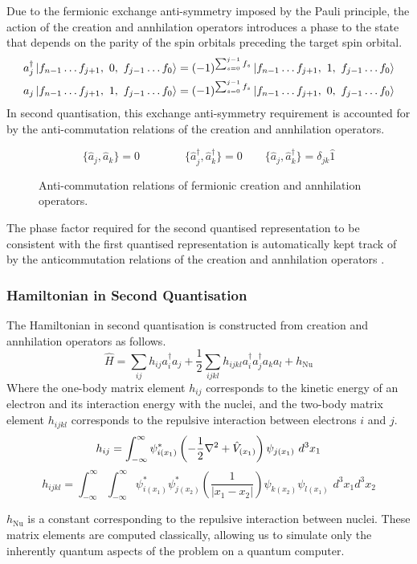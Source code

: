 Due to the fermionic exchange anti-symmetry imposed by the Pauli principle, the action of the creation and annhilation operators introduces a phase to the state that depends on the parity of the spin orbitals preceding the target spin orbital.
\begin{align*}
    a_j^\dagger \ket{f_{n-1} \dots
    f_{j+1},\,\, 0,\,\, f_{j-1} \dots f_0} &=
    (-1)^{\sum_{s=0}^{j-1} f_s}
    \ket{f_{n-1} \dots f_{j+1},\,\, 1,\,\, f_{j-1} \dots f_0} \\
    a_j \ket{f_{n-1} \dots f_{j+1},\,\, 1,\,\, f_{j-1} \dots f_0} &=
    (-1)^{\sum_{s=0}^{j-1} f_s}
    \ket{f_{n-1} \dots f_{j+1},\,\, 0,\,\, f_{j-1} \dots f_0}
\end{align*}
In second quantisation, this exchange anti-symmetry requirement is accounted for by the anti-commutation relations of the creation and annhilation operators.
\begin{figure}[H]
\begin{equation*}
    \{ \hat a_{j}, \hat a_{k} \} = 0 \qquad \qquad
    \{ \hat a_{j}^{\dagger}, \hat a_{k}^{\dagger} \} = 0 \qquad
    \{ \hat a_{j}, \hat a_{k}^{\dagger} \} = \delta_{jk} \hat{1}
\end{equation*}
\caption{Anti-commutation relations of fermionic creation and annhilation operators.}
\end{figure}
The phase factor required for the second quantised representation to be consistent with the first quantised representation is automatically kept track of by the anticommutation relations of the creation and annhilation operators \cite{Helgaker2000}.

\subsubsection{Hamiltonian in Second Quantisation}
The Hamiltonian in second quantisation is constructed from creation and annhilation operators as follows.
\begin{equation*}
    \hat H =
    \sum_{ij} h_{ij} a^\dagger_i a_j +
    \frac{1}{2} \sum_{ijkl} h_{ijkl} a^\dagger_i a^\dagger_j a_k a_l +
    h_\text{Nu}
\end{equation*}
Where the one-body matrix element $h_{ij}$ corresponds to the kinetic energy of an electron and its interaction energy with the nuclei, and the two-body matrix element $h_{ijkl}$ corresponds to the repulsive interaction between electrons $i$ and $j$.
\begin{equation*}
h_{ij} = \int^\infty_{-\infty} \psi^*_{i(x_1)} \left( - \frac{1}{2} \nabla^2 + \hat V_{(x_1)} \right) \psi_{j(x_1)} \,\, d^3 x_1 \\
\end{equation*}
\begin{equation*}
h_{ijkl} = \int^\infty_{-\infty} \int^\infty_{-\infty} \psi^*_{i(x_1)} \psi^*_{j(x_2)} \left( \frac{1}{|x_1 - x_2|} \right) \psi_{k(x_2)} \psi_{l(x_1)} \,\, d^3 x_1 d^3 x_2
\end{equation*}

$h_\text{Nu}$ is a constant corresponding to the repulsive interaction between nuclei. These matrix elements are computed classically, allowing us to simulate only the inherently quantum aspects of the problem on a quantum computer.

